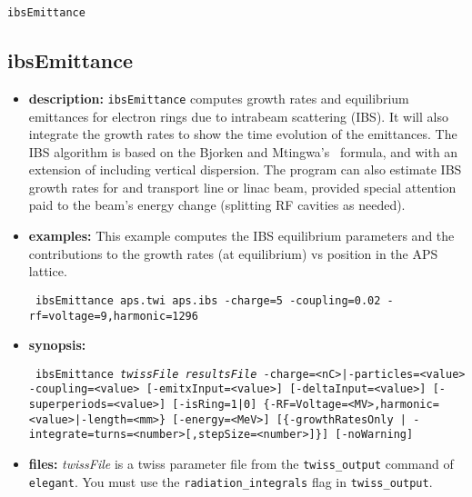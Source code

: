 \documentclass[11pt]{article}
\begin{document}
\begin{latexonly}
\newpage
\begin{center}{\Large\verb|ibsEmittance|}\end{center}
\end{latexonly}
\subsection{ibsEmittance}

\begin{itemize}
\item {\bf description:} \verb|ibsEmittance| computes growth rates and
equilibrium emittances for electron rings due to intrabeam scattering
(IBS).  It will also integrate the growth rates to show the time
evolution of the emittances.  The IBS algorithm is based on the
Bjorken and Mtingwa's~\cite{BM} formula, and with an extension of including vertical
dispersion. The program can also estimate IBS growth rates
for and transport line or linac beam, provided special attention paid to the beam's energy
change (splitting RF cavities as needed). 

\item {\bf examples:}
This example computes the IBS equilibrium parameters and the contributions to the
growth rates (at equilibrium) vs position in the APS lattice.
\begin{flushleft}{\tt 
ibsEmittance aps.twi aps.ibs -charge=5 -coupling=0.02 -rf=voltage=9,harmonic=1296
}\end{flushleft}

\item {\bf synopsis:}
\begin{flushleft}{\tt 
ibsEmittance {\em twissFile} {\em resultsFile}
 {-charge=<nC>|-particles=<value>} -coupling=<value>
 [-emitxInput=<value>] [-deltaInput=<value>] 
 [-superperiods=<value>] [-isRing=1|0]
 \{-RF=Voltage=<MV>,harmonic=<value>|-length=<mm>\}
 [-energy=<MeV>] 
 [\{-growthRatesOnly | -integrate=turns=<number>[,stepSize=<number>]\}]
 [-noWarning] 
}\end{flushleft}

\item {\bf files:}
{\em twissFile} is a twiss parameter file from the \verb|twiss_output| command of
{\tt elegant}.    You must use the \verb|radiation_integrals| flag in \verb|twiss_output|.


\end{itemize}
\end{document}
